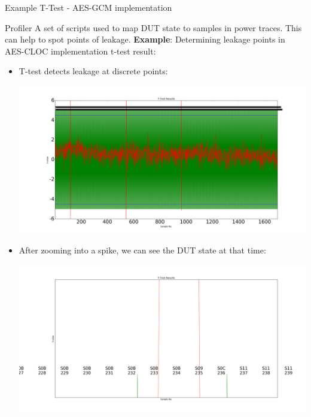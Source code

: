 \documentclass[xcolor=pdftex,dvipsnames,table,final]{beamer}
\begin{document}
\begin{frame}[fragile]{}
\begin{columns}[t]
\begin{column}{.31\linewidth}
\begin{block}{Example T-Test - AES-GCM implementation}
\begin{minipage}{0.5\linewidth}
        \end{minipage}
        
         
      \end{block}

      \begin{block}{Profiler}
         \vspace{-1ex}
         A set of scripts used to map DUT state to samples in power traces. This can help to spot points of leakage. \newline
         \textbf{Example}: Determining leakage points in AES-CLOC implementation t-test result:
         \begin{itemize}
         \item T-test detects leakage at discrete points:
          \begin{center}
          \includegraphics[scale=0.3]{images/profiler_1.png}
          \end{center}
          \item After zooming into a spike, we can see the DUT state at that time:
     \begin{center}
          \includegraphics[scale=0.3]{images/profiler_2.png}

\end{center}
\end{itemize}
\end{block}
\end{column}
\end{columns}
\end{frame}
\end{document}
